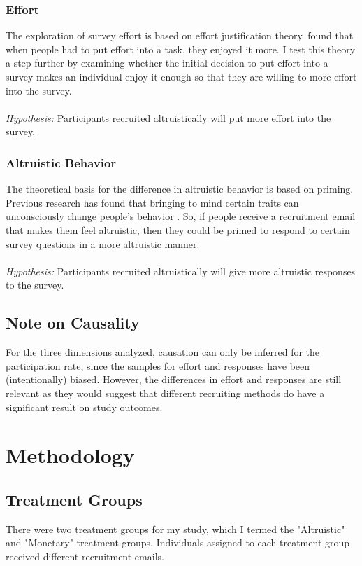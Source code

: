 \documentclass[12pt]{article}
\begin{document}
\subsubsection{Effort}
The exploration of survey effort is based on effort justification theory. \citet{aronson} found that when people had to put effort into a task, they enjoyed it more. I test this theory a step further by examining whether the initial decision to put effort into a survey makes an individual enjoy it enough so that they are willing to more effort into the survey.  \\ \\
\emph{Hypothesis: } Participants recruited altruistically will put more effort into the survey. 

\subsubsection{Altruistic Behavior}
The theoretical basis for the difference in altruistic behavior is based on priming. Previous research has found that bringing to mind certain traits can unconsciously change people's behavior \citep{bargh}. So, if people receive a recruitment email that makes them feel altruistic, then they could be primed to respond to certain survey questions in a more altruistic manner. \\ \\
\emph{Hypothesis: } Participants recruited altruistically will give more altruistic responses to the survey.

\subsection{Note on Causality}
For the three dimensions analyzed, causation can only be inferred for the participation rate, since the samples for effort and responses have been (intentionally) biased. However, the differences in effort and responses are still relevant as they would suggest that different recruiting methods do have a significant result on study outcomes. 

\section{Methodology} 
\subsection{Treatment Groups}
There were two treatment groups for my study, which I termed the "Altruistic" and "Monetary" treatment groups. Individuals assigned to each treatment group received different recruitment emails. 
\end{document}
